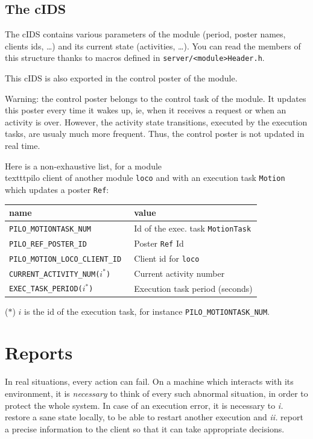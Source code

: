 \subsection{The cIDS}

The cIDS contains various parameters of the module (period, poster names,
clients ids, \ldots) and its current  state (activities, \ldots). You can
read  the members  of this  structure thanks   to macros  defined in 
\texttt{server/<module>Header.h}.

This cIDS is also exported in the control poster of the module.

Warning: the control poster belongs to the control task of the module.
It updates this poster every time it wakes up, ie, when it receives
a request or when an activity is over. However, the activity state
transitions, executed by the execution tasks, are usualy much more
frequent. Thus, the control poster is not updated in real time.


Here is a non-exhaustive list, for a module \\texttt{pilo} client of another
module \texttt{loco} and with an execution task \texttt{Motion} which updates a
poster \texttt{Ref}:

\bigbreak

{\small\begin{tabularx}{0.8\linewidth}{|l|X|}
\hline
name & value\\
\hline
\tt PILO\_MOTIONTASK\_NUM    & Id of the exec. task \texttt{MotionTask}\\
\tt PILO\_REF\_POSTER\_ID    & Poster \texttt{Ref} Id\\
\tt PILO\_MOTION\_LOCO\_CLIENT\_ID & Client id for \texttt{loco}\\
\tt CURRENT\_ACTIVITY\_NUM($i^*$) & Current activity number\\
\tt EXEC\_TASK\_PERIOD($i^*$) & Execution task period (seconds)\\
\hline
\end{tabularx}}

($*$)  $i$ is   the  id  of  the    execution  task, for   instance  
\texttt{PILO\_MOTIONTASK\_NUM}.


\section{Reports}

In real situations, every action can fail. On a machine which
interacts with  its environment, it is \emph{necessary} to think of every
such abnormal situation, in order to protect the whole system. In case of
an execution error,  it  is necessary to \emph{i.} restore a sane  state
locally, to be able to restart another  execution and \emph{ii.}  report a
precise information   to the  client so  that   it can   take appropriate
decisions.

